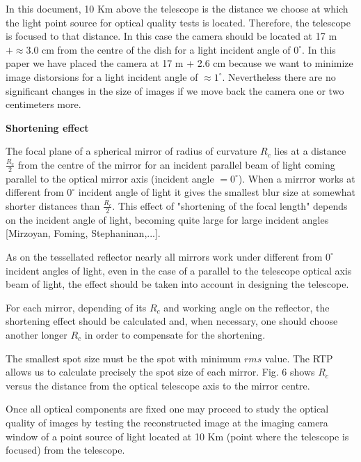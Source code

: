 In this document, 10 Km above the telescope is the distance we choose
at which the light point source for optical quality tests is located.
Therefore, the telescope is focused to that distance. In this case the
camera should be located at 17 m $+ \approx$3.0 cm from the centre of
the dish for a light incident angle of $0^{\circ}$. In this paper we
have placed the camera at 17 m + 2.6 cm because we want to minimize
image distorsions for a light incident angle of $\approx
1^{\circ}$. Nevertheless there are no significant changes in the size
of images if we move back the camera one or two centimeters more.

\vspace{0.5cm}

{\bf Shortening effect}

The focal plane of a spherical mirror of radius of curvature $R_c$
lies at a distance $\frac{R_c}{2}$ from the centre of the mirror for
an incident parallel beam of light coming parallel to the optical
mirror axis (incident angle $= 0^{\circ}$). When a mirrror works at
different from $0^{\circ}$ incident angle of light it gives the
smallest blur size at somewhat shorter distances than
$\frac{R_c}{2}$. This effect of "shortening of the focal length"
depends on the incident angle of light, becoming quite large for large
incident angles [Mirzoyan, Foming, Stephaninan,...].

As on the tessellated reflector nearly all mirrors work under
different from $0^{\circ}$ incident angles of light, even in the case
of a parallel to the telescope optical axis beam of light, the effect
should be taken into account in designing the telescope.

For each mirror, depending of its $R_c$ and working angle on the
reflector, the shortening effect should be calculated and, when
necessary, one should choose another longer $R_c$ in order to
compensate for the shortening.

The smallest spot size must be the spot with minimum $rms$ value. The
RTP allows us to calculate precisely the spot size of each
mirror. Fig. 6 shows $R_c$ versus the distance from the optical
telescope axis to the mirror centre.

Once all optical components are fixed one may proceed to study the
optical quality of images by testing the reconstructed image at the
imaging camera window of a point source of light located at 10 Km
(point where the telescope is focused) from the telescope.




